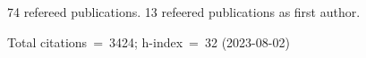 74 refereed publications. 13 refeered publications as first author.

Total citations~=~3424; h-index~=~32 (2023-08-02)